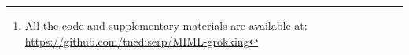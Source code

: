 \begin{abstract}
    We reproduce the grokking phenomenon [Power et al., 2022], that a neural network generalizes long after it memorizes the training data, for modular addition problem, and provide an explanation based on [Kumar et al., ICLR 2024].
    \footnote{All the code and supplementary materials are available at: \url{https://github.com/tnediserp/MIML-grokking}}
\end{abstract}
